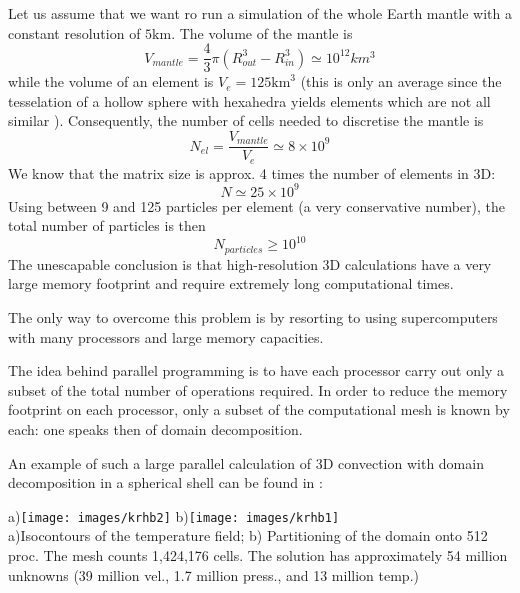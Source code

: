 
Let us assume that we want ro run a simulation of the whole Earth mantle
with a constant resolution of $5\text{km}$. The volume of the mantle is
\[
V_{mantle}=\frac{4}{3}\pi (R_{out}^3-R_{in}^3) \simeq  10^{12}  km^3
\]
while the volume of an element is $V_{e} = 125 \text{km}^3$ (this is 
only an average since the tesselation of a hollow sphere with 
hexahedra yields elements which are not all similar \cite{thie18}).
Consequently, the number of cells needed to discretise the mantle
is 
\[
N_{el}=\frac{V_{mantle}}{V_{e}}\simeq 8\times 10^9
\]
We know that the matrix size is approx. 4 times the number of elements in 3D:
\[
N\simeq 25 \times 10^9
\]
Using between 9 and 125 particles per element (a very conservative number),
the total number of particles is then
\[
N_{particles}  \geq 10^{10}
\]
The unescapable conclusion is that high-resolution 3D 
calculations 
 have a very large memory footprint and require extremely long computational times.

The only way to overcome this problem is by resorting to 
using supercomputers with many processors and large memory capacities.

The idea behind parallel programming is to have each processor carry out 
only a subset of the total number of operations required. In order to reduce 
the memory footprint on each processor, only a subset of the computational
mesh is known by each: one speaks then of domain decomposition.

An example of such a large parallel calculation of 3D convection with 
domain decomposition in a spherical shell can be found in \cite{krhb12}:

\begin{center}
a)\texttt{[image: images/krhb2]}
b)\texttt{[image: images/krhb1]} \\
{\small a)Isocontours of the temperature field; b) Partitioning of the domain onto 512 proc. The mesh counts 1,424,176 cells. The solution has approximately 54 million unknowns (39 million vel., 1.7 million press., and 13 million temp.)
}
\end{center}



